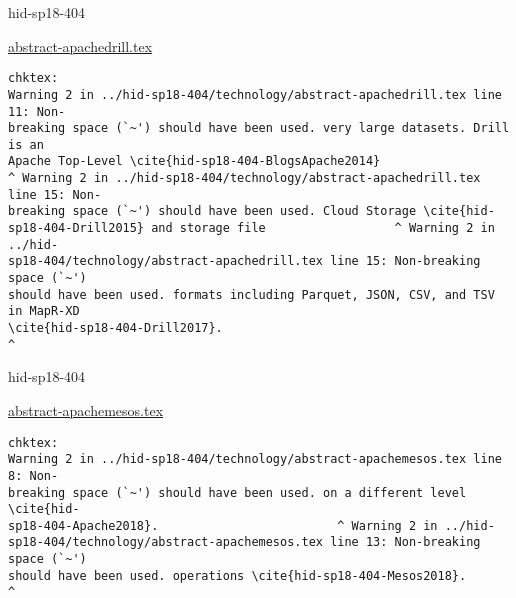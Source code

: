 

\begin{IU}

hid-sp18-404

\href{https://github.com/cloudmesh-community/hid-sp18-404/blob/master//technology/abstract-apachedrill.tex}{abstract-apachedrill.tex}

\begin{tiny}
\begin{verbatim}
chktex:
Warning 2 in ../hid-sp18-404/technology/abstract-apachedrill.tex line 11: Non-
breaking space (`~') should have been used. very large datasets. Drill is an
Apache Top-Level \cite{hid-sp18-404-BlogsApache2014}
^ Warning 2 in ../hid-sp18-404/technology/abstract-apachedrill.tex line 15: Non-
breaking space (`~') should have been used. Cloud Storage \cite{hid-
sp18-404-Drill2015} and storage file                  ^ Warning 2 in ../hid-
sp18-404/technology/abstract-apachedrill.tex line 15: Non-breaking space (`~')
should have been used. formats including Parquet, JSON, CSV, and TSV in MapR-XD
\cite{hid-sp18-404-Drill2017}.
^
\end{verbatim}
\end{tiny}
\end{IU}



\begin{IU}

hid-sp18-404

\href{https://github.com/cloudmesh-community/hid-sp18-404/blob/master//technology/abstract-apachemesos.tex}{abstract-apachemesos.tex}

\begin{tiny}
\begin{verbatim}
chktex:
Warning 2 in ../hid-sp18-404/technology/abstract-apachemesos.tex line 8: Non-
breaking space (`~') should have been used. on a different level \cite{hid-
sp18-404-Apache2018}.                         ^ Warning 2 in ../hid-
sp18-404/technology/abstract-apachemesos.tex line 13: Non-breaking space (`~')
should have been used. operations \cite{hid-sp18-404-Mesos2018}.              ^
\end{verbatim}
\end{tiny}
\end{IU}



